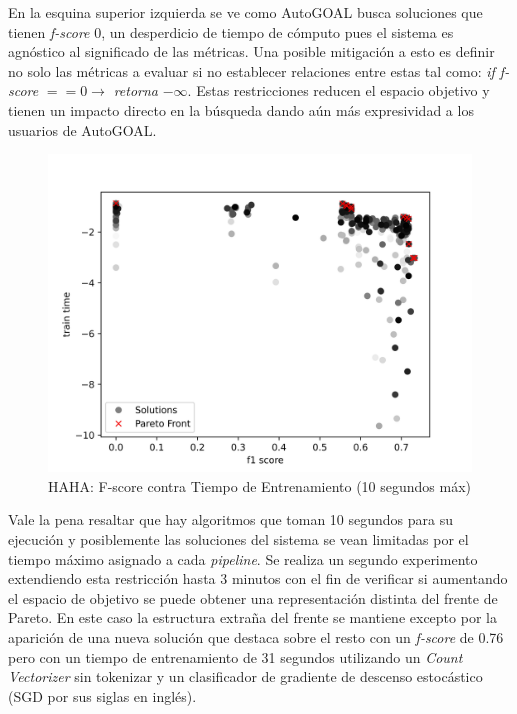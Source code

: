 En la esquina superior izquierda se ve como AutoGOAL busca soluciones que tienen \textit{f-score} 0, un desperdicio de tiempo de c\'omputo pues el sistema es agn\'ostico al significado de las m\'etricas. Una posible mitigaci\'on a esto es definir no solo las m\'etricas a evaluar si no establecer relaciones entre estas tal como: \textit{if f-score} $== 0 \rightarrow $ \textit{retorna} $-\infty$. Estas restricciones reducen el espacio objetivo y tienen un impacto directo en la b\'usqueda dando a\'un m\'as expresividad a los usuarios de AutoGOAL.

\begin{figure}[ht]
    \centering
    \includegraphics[scale=0.65]{Pictures/haha_fscore_vs_time.jpg}
    \caption{HAHA: F-score contra Tiempo de Entrenamiento (10 segundos m\'ax)}
    \label{impl:fig:haha:fscore_vs_time}
\end{figure}

Vale la pena resaltar que hay algoritmos que toman 10 segundos para su ejecuci\'on y posiblemente las soluciones del sistema se vean limitadas por el tiempo m\'aximo asignado a cada \textit{pipeline}. Se realiza un segundo experimento extendiendo esta restricci\'on hasta 3 minutos con el fin de verificar si aumentando el espacio de objetivo se puede obtener una representaci\'on distinta del frente de Pareto. En este caso la estructura extra\~na del frente se mantiene excepto por la aparici\'on de una nueva soluci\'on que destaca sobre el resto con un \textit{f-score} de 0.76 pero con un tiempo de entrenamiento de 31 segundos utilizando un \textit{Count Vectorizer} sin tokenizar y un  clasificador  de gradiente de descenso estoc\'astico (SGD por sus siglas en ingl\'es).

